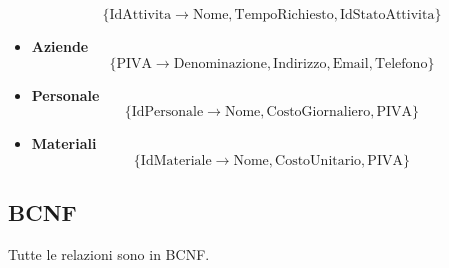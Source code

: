 \begin{itemize}
\begin{equation*}
		\{\text{IdAttivita}\to\text{Nome}, \text{TempoRichiesto}, \text{IdStatoAttivita}\}
	\end{equation*}
	\item \textbf{Aziende}
	\begin{equation*}
		\{\text{PIVA}\to\text{Denominazione}, \text{Indirizzo}, \text{Email}, \text{Telefono}\}
	\end{equation*}
	\item \textbf{Personale}
	\begin{equation*}
		\{\text{IdPersonale}\to\text{Nome}, \text{CostoGiornaliero}, \text{PIVA}\}
	\end{equation*}
	\item \textbf{Materiali}
	\begin{equation*}
		\{\text{IdMateriale}\to\text{Nome}, \text{CostoUnitario}, \text{PIVA}\}
	\end{equation*}
\end{itemize}
\subsection{BCNF}
Tutte le relazioni sono in BCNF.

